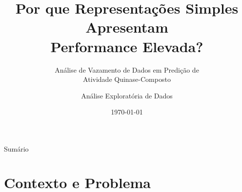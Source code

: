 \documentclass[aspectratio=169,11pt]{beamer}
\title[Análise de Vazamento de Dados]{Por que Representações Simples Apresentam\\Performance Elevada?}
\subtitle{Análise de Vazamento de Dados em Predição de\\Atividade Quinase-Composto}
\author{Análise Exploratória de Dados}
\institute{LNCC - Laboratório Nacional de Computação Científica}
\date{\today}
\begin{document}
\begin{frame}
    \titlepage
\end{frame}

\begin{frame}{Sumário}
    \tableofcontents
\end{frame}

\section{Contexto e Problema}
\end{document}
